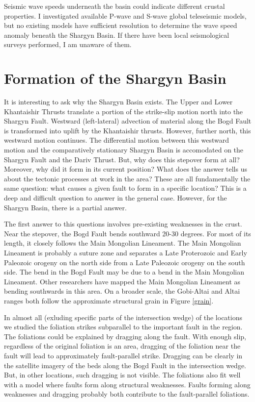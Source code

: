 \documentclass[10pt,a4paper]{article}
\begin{document}
	Seismic wave speeds underneath the basin could indicate different crustal properties. I investigated available P-wave and S-wave global teleseismic models, but no existing models have sufficient resolution to determine the wave speed anomaly beneath the Shargyn Basin. If there have been local seismological surveys performed, I am unaware of them. 

\section{Formation of the Shargyn Basin}
	It is interesting to ask why the Shargyn Basin exists. The Upper and Lower Khantaishir Thrusts translate a portion of the strike-slip motion north into the Shargyn Fault. Westward (left-lateral) advection of material along the Bogd Fault is transformed into uplift by the Khantaishir thrusts. However, further north, this westward motion continues. The differential motion between this westward motion and the comparatively stationary Shargyn Basin is accomodated on the Shargyn Fault and the Dariv Thrust. But, why does this stepover form at all? Moreover, why did it form in its current position? What does the answer tells us about the tectonic processes at work in the area? These are all fundamentally the same question: what causes a given fault to form in a specific location? This is a deep and difficult question to answer in the general case. However, for the Shargyn Basin, there is a partial answer.

	The first answer to this questions involves pre-existing weaknesses in the crust. Near the stepover, the Bogd Fault bends southward 20-30 degrees. For most of its length, it closely follows the Main Mongolian Lineament. The Main Mongolian Lineament is probably a suture zone and separates a Late Proterozoic and Early Paleozoic orogeny on the north side from a Late Paleozoic orogeny on the south side. The bend in the Bogd Fault may be due to a bend in the Main Mongolian Lineament. Other researchers have mapped the Main Mongolian Lineament as bending southwards in this area. On a broader scale, the Gobi-Altai and Altai ranges both follow the approximate structural grain in Figure \ref{grain}.
	
	In almost all (exluding specific parts of the intersection wedge) of the locations we studied the foliation strikes subparallel to the important fault in the region.  The foliations could be explained by dragging along the fault. With enough slip, regardless of the original foliation is an area, dragging of the foliation near the fault will lead to approximately fault-parallel strike. Dragging can be clearly in the satellite imagery of the beds along the Bogd Fault in the intersection wedge. But, in other locations, such dragging is not visible. The foliations also fit well with a model where faults form along structural weaknesses. Faults forming along weaknesses and dragging probably both contribute to the fault-parallel foliations. 
\end{document}
